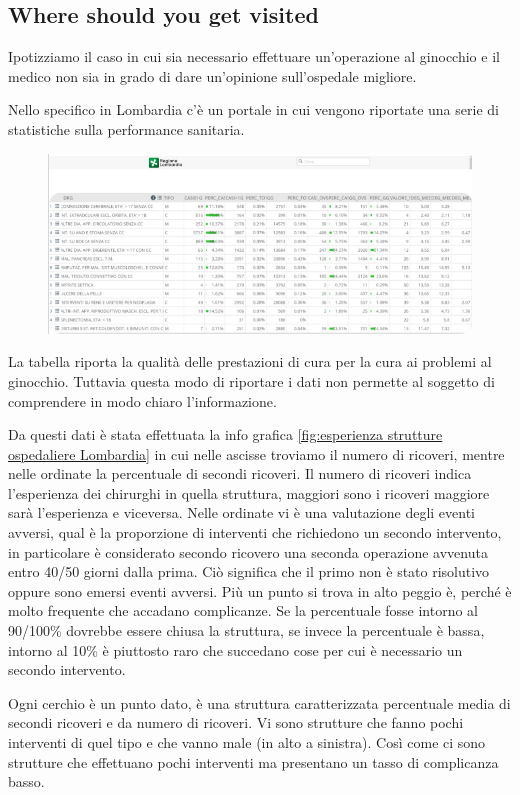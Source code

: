\documentclass[12pt,a4paper]{report}
\begin{document}
\subsection{Where should you get visited}
Ipotizziamo il caso in cui sia necessario effettuare un'operazione al ginocchio e il medico non sia in grado di dare un'opinione sull'ospedale migliore. 

Nello specifico in Lombardia c'è un portale in cui vengono riportate una serie di statistiche sulla performance sanitaria.

\begin{figure}[h]
	\centering
	\includegraphics[width=0.5\linewidth]{imgs datavis/Dati Lombardia.png}
	\caption{}
	\label{fig:lombardia}
\end{figure} 

La tabella riporta la qualità delle prestazioni di cura per la cura ai problemi al ginocchio. Tuttavia questa modo di riportare i dati non permette al soggetto di comprendere in modo chiaro l'informazione. 

Da questi dati è stata effettuata la info grafica \ref{fig:esperienza strutture ospedaliere Lombardia} in cui nelle ascisse troviamo il numero di ricoveri, mentre nelle ordinate la percentuale di secondi ricoveri. Il numero di ricoveri indica l'esperienza dei chirurghi in quella struttura, maggiori sono i ricoveri maggiore sarà l'esperienza e viceversa. Nelle ordinate vi è una valutazione degli eventi avversi, qual è la proporzione di interventi che richiedono un secondo intervento, in particolare è considerato secondo ricovero una seconda operazione avvenuta entro 40/50 giorni dalla prima. Ciò significa che il primo non è stato risolutivo oppure sono emersi eventi avversi.  Più un punto si trova in alto peggio è, perché è molto frequente che accadano complicanze. Se la percentuale fosse intorno al 90/100\% dovrebbe essere chiusa la struttura, se invece la percentuale è bassa, intorno al 10\% è piuttosto raro che succedano cose per cui è necessario un secondo intervento.  

Ogni cerchio è un punto dato, è una struttura caratterizzata percentuale media di secondi ricoveri e da numero di ricoveri. Vi sono strutture che fanno pochi interventi di quel tipo e che vanno male (in alto a sinistra). Così come ci sono strutture che effettuano pochi interventi ma presentano un tasso di complicanza basso. 
\end{document}
